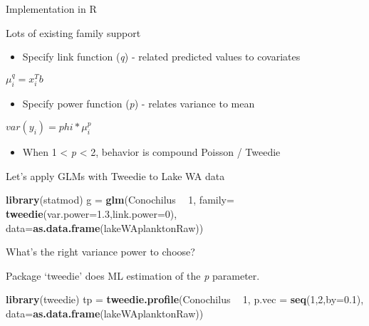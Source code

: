 \documentclass[ignorenonframetext,]{beamer}
\newenvironment{Shaded}{\begin{snugshade}}{\end{snugshade}}
\newcommand{\KeywordTok}[1]{\textcolor[rgb]{0.13,0.29,0.53}{\textbf{#1}}}
\newcommand{\DataTypeTok}[1]{\textcolor[rgb]{0.13,0.29,0.53}{#1}}
\newcommand{\DecValTok}[1]{\textcolor[rgb]{0.00,0.00,0.81}{#1}}
\newcommand{\FloatTok}[1]{\textcolor[rgb]{0.00,0.00,0.81}{#1}}
\newcommand{\StringTok}[1]{\textcolor[rgb]{0.31,0.60,0.02}{#1}}
\newcommand{\OperatorTok}[1]{\textcolor[rgb]{0.81,0.36,0.00}{\textbf{#1}}}
\newcommand{\NormalTok}[1]{#1}
\providecommand{\tightlist}{%
  \setlength{\itemsep}{0pt}\setlength{\parskip}{0pt}}
\begin{document}
\begin{frame}{Implementation in R}

Lots of existing family support

\begin{itemize}
\tightlist
\item
  Specify link function (\emph{q}) - related predicted values to
  covariates
\end{itemize}

\(μ_i^q = x_i^Tb\)

\begin{itemize}
\tightlist
\item
  Specify power function (\emph{p}) - relates variance to mean
\end{itemize}

\(var(y_i) = phi * μ_i^p\)

\begin{itemize}
\tightlist
\item
  When 1 \textless{} \emph{p} \textless{} 2, behavior is compound
  Poisson / Tweedie
\end{itemize}

\end{frame}

\begin{frame}[fragile]{Let's apply GLMs with Tweedie to Lake WA data}

\begin{Shaded}
\begin{Highlighting}[]
\KeywordTok{library}\NormalTok{(statmod)}
\NormalTok{g =}\StringTok{ }\KeywordTok{glm}\NormalTok{(Conochilus }\OperatorTok{~}\StringTok{ }\DecValTok{1}\NormalTok{, }\DataTypeTok{family=}
    \KeywordTok{tweedie}\NormalTok{(}\DataTypeTok{var.power=}\FloatTok{1.3}\NormalTok{,}\DataTypeTok{link.power=}\DecValTok{0}\NormalTok{), }
  \DataTypeTok{data=}\KeywordTok{as.data.frame}\NormalTok{(lakeWAplanktonRaw))}
\end{Highlighting}
\end{Shaded}

\end{frame}

\begin{frame}[fragile]{What's the right variance power to choose?}

Package `tweedie' does ML estimation of the \emph{p} parameter.

\begin{Shaded}
\begin{Highlighting}[]
\KeywordTok{library}\NormalTok{(tweedie)}
\NormalTok{tp =}\StringTok{ }\KeywordTok{tweedie.profile}\NormalTok{(Conochilus }\OperatorTok{~}\StringTok{ }\DecValTok{1}\NormalTok{, }
  \DataTypeTok{p.vec =} \KeywordTok{seq}\NormalTok{(}\DecValTok{1}\NormalTok{,}\DecValTok{2}\NormalTok{,}\DataTypeTok{by=}\FloatTok{0.1}\NormalTok{), }
  \DataTypeTok{data=}\KeywordTok{as.data.frame}\NormalTok{(lakeWAplanktonRaw))}
\end{Highlighting}
\end{Shaded}

\end{frame}
\end{document}
